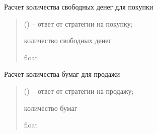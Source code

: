 \documentclass[letterpaper,10pt,english,openany,oneside]{sphinxmanual}
\begin{document}
\begin{fulllineitems}
\begin{fulllineitems}
\label{\detokenize{src.structures:src.structures.st_portfolio.Portfolio.calc_amount_buy}}
\pysigstartsignatures
{}
\pysigstopsignatures
\sphinxAtStartPar
Расчет количества свободных денег для покупки
\begin{quote}\begin{description}
\sphinxAtStartPar
{} ({\hyperref[\detokenize{src.structures:src.structures.st_strategies.StrategyResponse}]{}}) – ответ от стратегии на покупку;

\sphinxAtStartPar
количество свободных денег

\sphinxAtStartPar
float

\end{description}\end{quote}

\end{fulllineitems}


\begin{fulllineitems}
\label{\detokenize{src.structures:src.structures.st_portfolio.Portfolio.calc_amount_sell}}
\pysigstartsignatures
{}
\pysigstopsignatures
\sphinxAtStartPar
Расчет количества бумаг для продажи
\begin{quote}\begin{description}
\sphinxAtStartPar
{} ({\hyperref[\detokenize{src.structures:src.structures.st_strategies.StrategyResponse}]{}}) – ответ от стратегии на продажу;

\sphinxAtStartPar
количество бумаг

\sphinxAtStartPar
float

\end{description}\end{quote}


\end{fulllineitems}
\end{fulllineitems}
\end{document}
